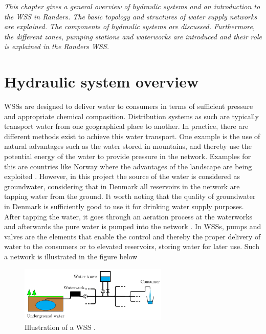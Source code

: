 \emph{This chapter gives a general overview of hydraulic systems and an introduction to the WSS in Randers. The basic topology and structures of water supply networks are explained. The components of hydraulic systems are discussed. Furthermore, the different zones, pumping stations and waterworks are introduced and their role is explained in the Randers WSS.}

\section{Hydraulic system overview}
\label{hydraulic_system_overview}

WSSs are designed to deliver water to consumers in terms of sufficient pressure and appropriate chemical composition. Distribution systems as such are typically transport water from one geographical place to another. In practice, there are different methods exist to achieve this water transport. One example is the use of natural advantages such as the water stored in mountains, and thereby use the potential energy of the water to provide pressure in the network. Examples for this are countries like Norway where the advantages of the landscape are being exploited \cite{norway_mountains}. However, in this project the source of the water is considered as groundwater, considering that in Denmark all reservoirs in the network are tapping water from the ground. It worth noting that the quality of groundwater in Denmark is sufficiently good to use it for drinking water supply purposes. After tapping the water, it goes through an aeration process at the waterworks and afterwards the pure water is pumped into the network \cite{prahata}. In WSSs, pumps and valves are the elements that enable the control and thereby the proper delivery of water to the consumers or to elevated reservoirs, storing water for later use. Such a network is illustrated in the figure below

\begin{figure}[H]
\centering
\includegraphics[width=0.63\textwidth]{report/pictures/WSS_illustration}
\caption{Illustration of a WSS \cite{kenneth_houe}.}
\label{fig:WSS_example}
\end{figure}

